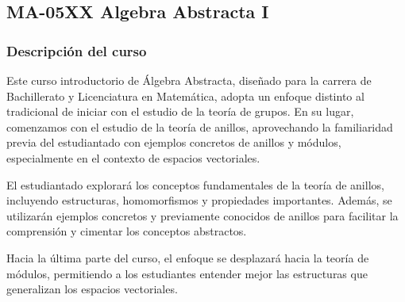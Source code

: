 \newpage
\subsection*{MA-05XX Algebra Abstracta I}

\begin{refsection}
\begin{table}[H]
\end{table}



\subsubsection*{Descripción del curso}

Este curso introductorio de Álgebra Abstracta, diseñado para la carrera de Bachillerato y Licenciatura en Matemática, adopta un enfoque distinto al tradicional de iniciar con el estudio de la teoría de grupos. En su lugar, comenzamos con el estudio de la teoría de anillos, aprovechando la familiaridad previa del estudiantado con ejemplos concretos de anillos y módulos, especialmente en el contexto de espacios vectoriales.

El estudiantado explorará los conceptos fundamentales de la teoría de anillos, incluyendo estructuras, homomorfismos y propiedades importantes. Además, se utilizarán ejemplos concretos y previamente conocidos de anillos para facilitar la comprensión y cimentar los conceptos abstractos. 

Hacia la última parte del curso, el enfoque se desplazará hacia la teoría de módulos, permitiendo a los estudiantes entender mejor las estructuras que generalizan los espacios vectoriales.





\end{refsection}

